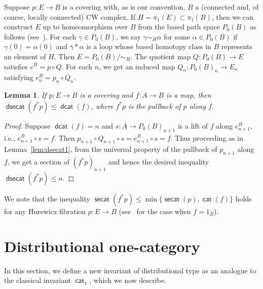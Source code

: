 \documentclass[amscd,amssymb,verbatim,11pt]{amsart}
\theoremstyle{plain}
\newtheorem{lemma}[thm]{Lemma}
\theoremstyle{definition}
\DeclareMathOperator{\cat}{{\mathsf{cat}}}
\DeclareMathOperator{\secat}{{\mathsf{secat}}}
\DeclareMathOperator{\dsecat}{{\mathsf{dsecat}}}
\DeclareMathOperator{\dcat}{{\mathsf{dcat}}}
\begin{document}
Suppose $p \colon E\to B$ is a covering with, as is our convention, $B$ a (connected and, of course, locally connected) CW complex. If $H=\pi_1(E)\subset\pi_1(B)$, then we can construct $E$ up to homeomorphism over $B$ from the based path space $P_0(B)$ as follows (see~\cite[Chapter~2, Section~5]{Sp}). For each $\gamma\in P_0(B)$, we say $\gamma\sim_H\alpha$ for some $\alpha\in P_0(B)$ if $\gamma(0)=\alpha(0)$ and $\bar\gamma\ast\alpha$ is a loop whose based homotopy class in $B$ represents an element of $H$. Then $E=P_0(B)/\sim_H$. The quotient map $Q:P_0(B)\to E$ satisfies $e^B=p\circ Q$. For each $n$, we get an induced map $Q_{n}:P_0(B)_n\to E_n$ satisfying $e^B_n=p_n\circ Q_n$.

\begin{lemma}\label{lem:dsecat2}
    If $p:E\to B$ is a covering and $f:A\to B$ is a map, then $\dsecat(f^*p)\le\dcat(f)$, where $f^*p$ is the pullback of $p$ along $f$.
\end{lemma}

\begin{proof}
    Suppose $\dcat(f)=n$ and $s:A\to P_0(B)_{n+1}$ is a lift of $f$ along $e^B_{n+1}$, i.e., $e^B_{n+1}\circ s=f$. Then $p_{n+1}\circ Q_{n+1}\circ s=e^B_{n+1}\circ s=f$. Thus proceeding as in Lemma~\ref{lem:dsecat1}, from the universal property of the pullback of $p_{n+1}$ along $f$, we get a section of $(f^*p)_{n+1}$ and hence the desired inequality $\dsecat(f^*p)\le n$.
\end{proof}

We note that the inequality $\secat(f^*p)\le\min\{\secat(p),\cat(f)\}$ holds for any Hurewicz fibration $p:E\to B$ (see~\cite[Section 9.3]{CLOT} for the case when $f=1_B$).





\section{Distributional one-category}\label{sec:dcat1}
In this section, we define a new invariant of distributional type as an analogue to the classical invariant $\cat_1$, which we now describe. 
\end{document}
